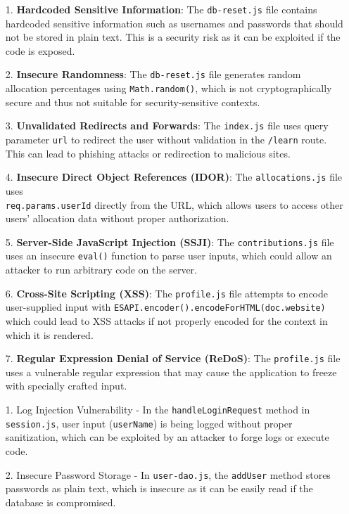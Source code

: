 \begin{enumerate}
  \item[1.] \textbf{Hardcoded Sensitive Information}: The \texttt{db-reset.js} file contains hardcoded sensitive information such as usernames and passwords that should not be stored in plain text. This is a security risk as it can be exploited if the code is exposed.
  \item[2.] \textbf{Insecure Randomness}: The \texttt{db-reset.js} file generates random allocation percentages using \texttt{Math.random()}, which is not cryptographically secure and thus not suitable for security-sensitive contexts.
  \item[3.] \textbf{Unvalidated Redirects and Forwards}: The \texttt{index.js} file uses query parameter \texttt{url} to redirect the user without validation in the \texttt{/learn} route. This can lead to phishing attacks or redirection to malicious sites.
  \item[4.] \textbf{Insecure Direct Object References (IDOR)}: The \texttt{allocations.js} file uses \\\texttt{req.params.userId} directly from the URL, which allows users to access other users' allocation data without proper authorization.
  \item[5.] \textbf{Server-Side JavaScript Injection (SSJI)}: The \texttt{contributions.js} file uses an insecure \texttt{eval()} function to parse user inputs, which could allow an attacker to run arbitrary code on the server.
  \item[6.] \textbf{Cross-Site Scripting (XSS)}: The \texttt{profile.js} file attempts to encode user-supplied input with \texttt{ESAPI.encoder().encodeForHTML(doc.website)} which could lead to XSS attacks if not properly encoded for the context in which it is rendered.
  \item[7.] \textbf{Regular Expression Denial of Service (ReDoS)}: The \texttt{profile.js} file uses a vulnerable regular expression that may cause the application to freeze with specially crafted input. \\
  \item[1.] Log Injection Vulnerability - In the \texttt{handleLoginRequest} method in \texttt{session.js}, user input (\texttt{userName}) is being logged without proper sanitization, which can be exploited by an attacker to forge logs or execute code.
  \item[2.] Insecure Password Storage - In \texttt{user-dao.js}, the \texttt{addUser} method stores passwords as plain text, which is insecure as it can be easily read if the database is compromised.

\end{enumerate}
